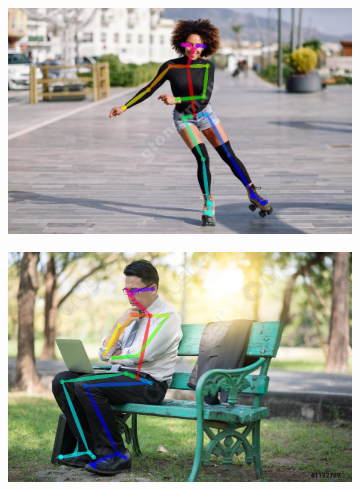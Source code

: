 \begin{figure}[h]
\begin{subfigure}[b]{.5\textwidth}
	\centering
	\includegraphics[width=\textwidth]{./images/OpenPose/19}
	\caption{ }
\end{subfigure}
\begin{subfigure}[b]{.5\textwidth}
	\centering
    \includegraphics[width=\textwidth]{./images/OpenPose/23}
    \caption{ }
\end{subfigure}
\begin{subfigure}[b]{.5\textwidth}
	\centering

\end{subfigure}
\end{figure}
